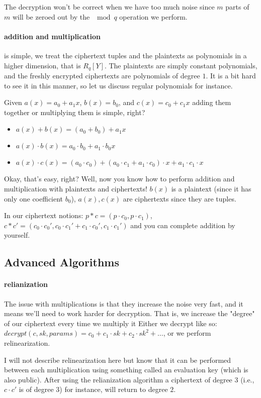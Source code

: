 The decryption won't be correct when we have too much noise since $m$ parts of $m$
will be zeroed out by the $\mod q$ operation we perform.

\paragraph{addition and multiplication}
is simple, we treat the ciphertext tuples and the plaintexts as polynomials in a higher dimension,
that is $R_q[Y]$. The plaintexts are simply constant polynomials, and the freshly encrypted ciphertexts are polynomials 
of degree $1$.
It is a bit hard to see it in this manner, so let us discuss regular polynomials for instance.

Given $a(x)=a_0+a_1x$, $b(x)=b_0$, and $c(x)=c_0+c_1x$ adding them together or multiplying them is simple, right?
\begin{itemize}
    \item $a(x)+b(x)= (a_0+b_0)+a_1x$
    \item $a(x)\cdot b(x)= a_0\cdot b_0 + a_1\cdot b_0 x$
    \item $a(x) \cdot c(x)= (a_0\cdot c_0) +(a_0\cdot c_1 + a_1\cdot c_0)\cdot x + a_1\cdot c_1 \cdot x$
\end{itemize}

Okay, that's easy, right? Well, now you know how to perform addition and multiplication with plaintexts and ciphertexts!
$b(x)$ is a plaintext (since it has only one coefficient $b_0$), $a(x),c(x)$ are ciphertexts
since they are tuples.

In our ciphertext notions:
$p*c=(p\cdot c_0, p\cdot c_1)$,
$c*c'=(c_0\cdot c_0', c_0\cdot c_1' + c_1\cdot c_0', c_1\cdot c_1')$ and you can complete addition by yourself.

\subsection{Advanced Algorithms}
\paragraph{relianization}
The issue with multiplications is that they increase the noise very fast, and it means we'll need to work harder 
for decryption. That is, we increase the "degree" of our ciphertext every time we multiply it
Either we decrypt like so: $decrypt(c, sk, params)= c_0 +c_1\cdot sk+c_2\cdot sk^2+\dots$, 
or we perform relinearization.

I will not describe relinearization here but know that it can be performed between each multiplication
using something called an evaluation key (which is also public). After using the relianization algorithm 
a ciphertext of degree $3$ (i.e., $c\cdot c'$ is of degree $3$) for instance, will return to degree $2$.

